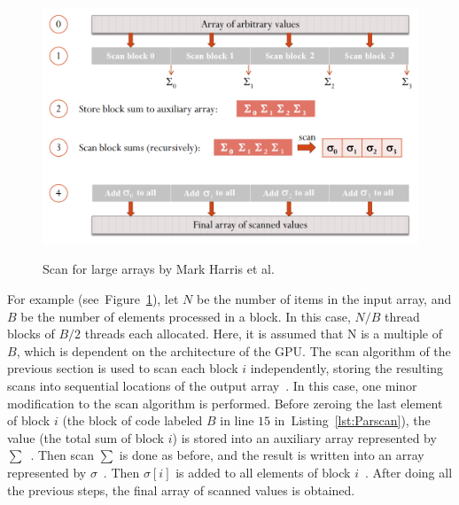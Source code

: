 \documentclass[Ingles]{ic-tese-v1}
\newcommand{\rfig}[1]{Figure~\ref{fig:#1}}
\newcommand{\rlst}[1]{Listing~\ref{lst:#1}}
\begin{document}
\begin{figure}[t]
	\centering
	\caption{Scan for large arrays by Mark Harris et al.}
	\includegraphics[scale=0.5]{images/largescan.png}
	\label{fig:largescan}
\end{figure}

For example (see~\rfig{largescan}), let $N$ be the number of items in
the input array, and $B$ be the number of elements processed in a block. In this case,
$N/B$ thread blocks of $B/2$ threads each allocated. Here,  it is assumed that N
is a multiple of $B$, which is dependent on the architecture  of the GPU. The scan
algorithm of the previous section is used  to scan each block $i$ independently,
storing the resulting scans into sequential locations of the output
array~. In this case,  one minor modification to the scan algorithm is performed.
Before zeroing the last element of block $i$ (the block of code labeled $B$ in
line $15$ in~\rlst{Parscan}), the value (the total sum of block
$i$) is stored into an auxiliary array represented by $\sum$~. Then scan $\sum$
is done as before, and the  result is written into an array represented by
$\sigma$~. Then $\sigma[i]$ is added to all elements of block
$i$~. After doing all the previous steps, the final
array of scanned values is obtained.
\end{document}
